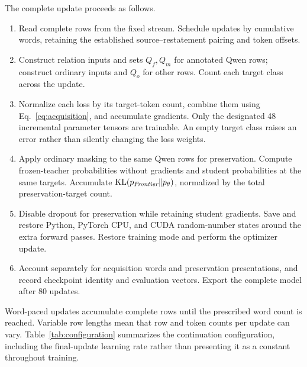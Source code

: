 The complete update proceeds as follows.

\begin{enumerate}
\item Read complete rows from the fixed stream. Schedule updates by cumulative words, retaining the established source--restatement pairing and token offsets.
\item Construct relation inputs and sets $Q_f,Q_m$ for annotated Qwen rows; construct ordinary inputs and $Q_o$ for other rows. Count each target class across the update.
\item Normalize each loss by its target-token count, combine them using Eq.~\eqref{eq:acquisition}, and accumulate gradients. Only the designated 48 incremental parameter tensors are trainable. An empty target class raises an error rather than silently changing the loss weights.
\item Apply ordinary masking to the same Qwen rows for preservation. Compute frozen-teacher probabilities without gradients and student probabilities at the same targets. Accumulate $\operatorname{KL}(p_{\textit{Frontier}}\|p_\theta)$, normalized by the total preservation-target count.
\item Disable dropout for preservation while retaining student gradients. Save and restore Python, PyTorch CPU, and CUDA random-number states around the extra forward passes. Restore training mode and perform the optimizer update.
\item Account separately for acquisition words and preservation presentations, and record checkpoint identity and evaluation vectors. Export the complete model after 80 updates.
\end{enumerate}

Word-paced updates accumulate complete rows until the prescribed word count is reached. Variable row lengths mean that row and token counts per update can vary. Table~\ref{tab:configuration} summarizes the continuation configuration, including the final-update learning rate rather than presenting it as a constant throughout training.

